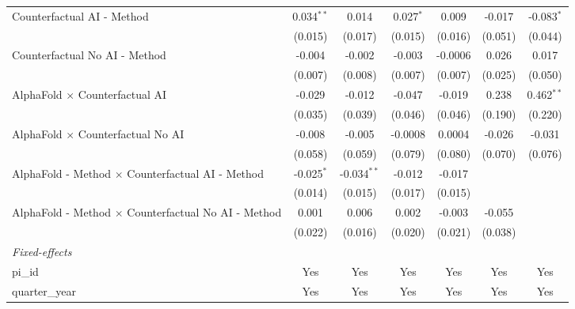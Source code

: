 \begin{tabular}{lcccccc}
   Counterfactual AI - Method                                 & 0.034$^{**}$ & 0.014         & 0.027$^{*}$  & 0.009       & -0.017       & -0.083$^{*}$\\   
                                                              & (0.015)      & (0.017)       & (0.015)      & (0.016)     & (0.051)      & (0.044)\\   
   Counterfactual No AI - Method                              & -0.004       & -0.002        & -0.003       & -0.0006     & 0.026        & 0.017\\   
                                                              & (0.007)      & (0.008)       & (0.007)      & (0.007)     & (0.025)      & (0.050)\\   
   AlphaFold $\times$ Counterfactual AI                       & -0.029       & -0.012        & -0.047       & -0.019      & 0.238        & 0.462$^{**}$\\   
                                                              & (0.035)      & (0.039)       & (0.046)      & (0.046)     & (0.190)      & (0.220)\\   
   AlphaFold $\times$ Counterfactual No AI                    & -0.008       & -0.005        & -0.0008      & 0.0004      & -0.026       & -0.031\\   
                                                              & (0.058)      & (0.059)       & (0.079)      & (0.080)     & (0.070)      & (0.076)\\   
   AlphaFold - Method $\times$ Counterfactual AI - Method     & -0.025$^{*}$ & -0.034$^{**}$ & -0.012       & -0.017      &              &   \\   
                                                              & (0.014)      & (0.015)       & (0.017)      & (0.015)     &              &   \\   
   AlphaFold - Method $\times$ Counterfactual No AI - Method  & 0.001        & 0.006         & 0.002        & -0.003      & -0.055       &   \\   
                                                              & (0.022)      & (0.016)       & (0.020)      & (0.021)     & (0.038)      &   \\   
   \midrule
   \emph{Fixed-effects}\\
   pi\_id                                                     & Yes          & Yes           & Yes          & Yes         & Yes          & Yes\\  
   quarter\_year                                              & Yes          & Yes           & Yes          & Yes         & Yes          & Yes\\  

\end{tabular}
